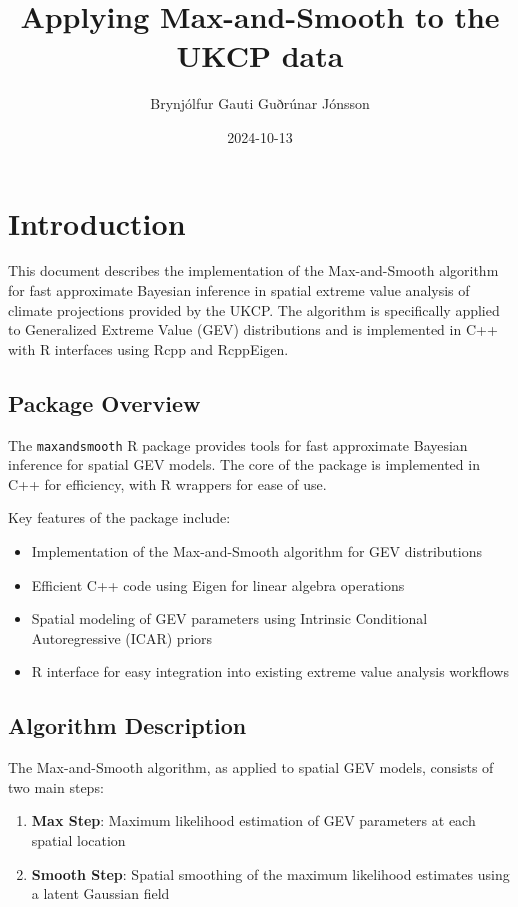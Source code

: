 \documentclass[
  letterpaper,
  DIV=11,
  numbers=noendperiod]{scrartcl}
\title{Applying Max-and-Smooth to the UKCP data}
\author{Brynjólfur Gauti Guðrúnar Jónsson}
\date{2024-10-13}
\providecommand{\tightlist}{%
  \setlength{\itemsep}{0pt}\setlength{\parskip}{0pt}}\usepackage{longtable,booktabs,array}
\begin{document}
\maketitle


\section{Introduction}\label{introduction}

This document describes the implementation of the Max-and-Smooth
algorithm for fast approximate Bayesian inference in spatial extreme
value analysis of climate projections provided by the UKCP. The
algorithm is specifically applied to Generalized Extreme Value (GEV)
distributions and is implemented in C++ with R interfaces using Rcpp and
RcppEigen.

\subsection{Package Overview}\label{package-overview}

The \texttt{maxandsmooth} R package provides tools for fast approximate
Bayesian inference for spatial GEV models. The core of the package is
implemented in C++ for efficiency, with R wrappers for ease of use.

Key features of the package include:

\begin{itemize}
\tightlist
\item
  Implementation of the Max-and-Smooth algorithm for GEV distributions
\item
  Efficient C++ code using Eigen for linear algebra operations
\item
  Spatial modeling of GEV parameters using Intrinsic Conditional
  Autoregressive (ICAR) priors
\item
  R interface for easy integration into existing extreme value analysis
  workflows
\end{itemize}

\subsection{Algorithm Description}\label{algorithm-description}

The Max-and-Smooth algorithm, as applied to spatial GEV models, consists
of two main steps:

\begin{enumerate}
\def\labelenumi{\arabic{enumi}.}
\tightlist
\item
  \textbf{Max Step}: Maximum likelihood estimation of GEV parameters at
  each spatial location
\item
  \textbf{Smooth Step}: Spatial smoothing of the maximum likelihood
  estimates using a latent Gaussian field
\end{enumerate}
\end{document}
